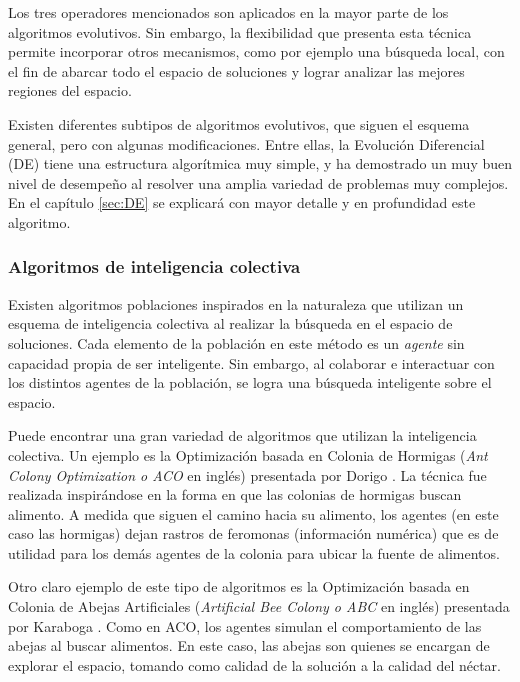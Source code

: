 Los tres operadores mencionados son aplicados en la mayor parte de los algoritmos evolutivos. Sin embargo, la flexibilidad que presenta esta técnica permite incorporar otros mecanismos, como por ejemplo una búsqueda local, con el fin de abarcar todo el espacio de soluciones y lograr analizar las mejores regiones del espacio.


Existen diferentes subtipos de algoritmos evolutivos, que siguen el esquema general, pero con algunas modificaciones. Entre ellas, la Evolución Diferencial (DE) tiene una estructura algorítmica muy simple, y ha demostrado un muy buen nivel de desempeño al resolver una amplia variedad de problemas muy complejos. En el capítulo \ref{sec:DE} se explicará con mayor detalle y en profundidad este algoritmo.


\subsubsection{Algoritmos de inteligencia colectiva}

Existen algoritmos poblaciones inspirados en la naturaleza que utilizan un esquema de inteligencia colectiva al realizar la búsqueda en el espacio de soluciones. Cada elemento de la población en este método es un \textit{agente} sin capacidad propia de ser inteligente. Sin embargo, al colaborar e interactuar con los distintos agentes de la población, se logra una búsqueda inteligente sobre el espacio.


Puede encontrar una gran variedad de algoritmos que utilizan la inteligencia colectiva. Un ejemplo es la Optimización basada en Colonia de Hormigas (\textit{Ant Colony Optimization o ACO} en inglés) presentada por Dorigo \cite{CorneDorigoDasguptaMoscato, DorigoBirattari}. La técnica fue realizada inspirándose en la forma en que las colonias de hormigas buscan alimento. A medida que siguen el camino hacia su alimento, los agentes (en este caso las hormigas) dejan rastros de feromonas (información numérica) que es de utilidad para los demás agentes de la colonia para ubicar la fuente de alimentos.


Otro claro ejemplo de este tipo de algoritmos es la Optimización basada en Colonia de Abejas Artificiales  (\textit{Artificial Bee Colony o ABC} en inglés) presentada por Karaboga \cite{KarabogaBasturk, Karaboga} . Como en ACO, los agentes simulan el comportamiento de las abejas al buscar alimentos. En este caso, las abejas son quienes se encargan de explorar el espacio, tomando como calidad de la solución a la calidad del néctar. 


